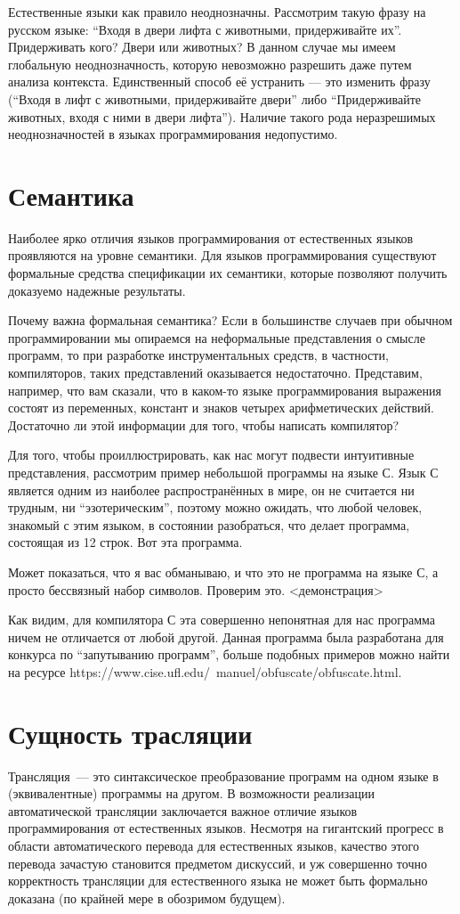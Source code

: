 \documentclass{article}
\begin{document}
Естественные языки как правило неоднозначны. Рассмотрим такую фразу на русском языке: ``Входя в двери лифта с животными, придерживайте их''. Придерживать кого? Двери или
животных? В данном случае мы имеем глобальную неоднозначность, которую невозможно разрешить даже путем анализа контекста. Единственный способ её устранить --- это изменить фразу
(``Входя в лифт с животными, придерживайте двери'' либо ``Придерживайте животных, входя с ними в двери лифта''). Наличие такого рода неразрешимых неоднозначностей в
языках программирования недопустимо.

\section{Семантика}

Наиболее ярко отличия языков программирования от естественных языков проявляются на уровне семантики. Для языков программирования существуют формальные
средства спецификации их семантики, которые позволяют получить доказуемо надежные результаты.

Почему важна формальная семантика? Если в большинстве случаев при обычном программировании мы опираемся на неформальные представления о смысле программ,
то при разработке инструментальных средств, в частности, компиляторов, таких представлений оказывается недостаточно. Представим, например, что вам сказали,
что в каком-то языке программирования выражения состоят из переменных, констант и знаков четырех арифметических действий. Достаточно ли этой информации для
того, чтобы написать компилятор?  

Для того, чтобы проиллюстрировать, как нас могут подвести интуитивные представления, рассмотрим пример небольшой программы на языке С. Язык С является одним из
наиболее распространённых в мире, он не считается ни трудным, ни ``эзотерическим'', поэтому можно ожидать, что любой человек, знакомый с этим языком, в
состоянии разобраться, что делает программа, состоящая из 12 строк. Вот эта программа.

Может показаться, что я вас обманываю, и что это не программа на языке С, а просто бессвязный набор символов. Проверим это. <демонстрация>

Как видим, для компилятора С эта совершенно непонятная для нас программа ничем не отличается от любой другой. Данная программа была разработана для конкурса по
``запутыванию программ'', больше подобных примеров можно найти на ресурсе https://www.cise.ufl.edu/~manuel/obfuscate/obfuscate.html. 

\section{Сущность трасляции}

Трансляция~--- это синтаксическое преобразование программ на одном языке в (эквивалентные) программы на другом. В возможности реализации автоматической
трансляции заключается важное отличие языков программирования от естественных языков. Несмотря на гигантский прогресс в области автоматического перевода
для естественных языков, качество этого перевода зачастую становится предметом дискуссий, и уж совершенно точно корректность трансляции для естественного
языка не может быть формально доказана (по крайней мере в обозримом будущем).
\end{document}
